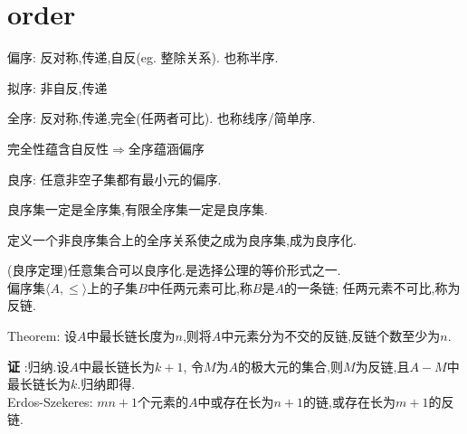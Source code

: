 \section{order}
偏序:
反对称,传递,自反(eg. 整除关系).
也称半序.

拟序:
非自反,传递

全序:
反对称,传递,完全(任两者可比).
也称线序/简单序.

完全性蕴含自反性$ \Rightarrow $全序蕴涵偏序

良序:
任意非空子集都有最小元的偏序.

良序集一定是全序集,有限全序集一定是良序集.

定义一个非良序集合上的全序关系使之成为良序集,成为良序化.

(良序定理)任意集合可以良序化.是选择公理的等价形式之一.
\\


偏序集$ \langle A,\le \rangle$上的子集$ B$中任两元素可比,称$ B$是$ A$的一条链;
任两元素不可比,称为反链.

Theorem:
设$ A$中最长链长度为$ n$,则将$ A$中元素分为不交的反链,反链个数至少为$ n$.

{\bf 证 }:归纳.设$ A$中最长链长为$ k+1$,
令$ M$为$ A$的极大元的集合,则$ M$为反链,且$ A-M$中最长链长为$ k$.归纳即得.
\\

Erdos-Szekeres:
$ mn+1$个元素的$ A$中或存在长为$ n+1$的链,或存在长为$ m+1$的反链.

